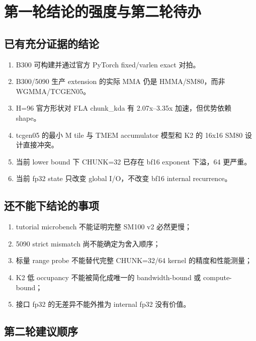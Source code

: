 \documentclass[11pt,a4paper,fontset=none]{ctexart}
\begin{document}
\section{第一轮结论的强度与第二轮待办}

\subsection{已有充分证据的结论}

\begin{enumerate}
  \item B300 可构建并通过官方 PyTorch fixed/varlen exact 对拍。
  \item B300/5090 生产 extension 的实际 MMA 仍是 HMMA/SM80，而非 WGMMA/TCGEN05。
  \item H=96 官方形状对 FLA chunk\_kda 有 2.07x--3.35x 加速，但优势依赖 shape。
  \item tcgen05 的最小 M tile 与 TMEM accumulator 模型和 K2 的 16x16 SM80
        设计直接冲突。
  \item 当前 lower bound 下 CHUNK=32 已存在 bf16 exponent 下溢，64 更严重。
  \item 当前 fp32 state 只改变 global I/O，不改变 bf16 internal recurrence。
\end{enumerate}

\subsection{还不能下结论的事项}

\begin{enumerate}
  \item tutorial microbench 不能证明完整 SM100 v2 必然更慢；
  \item 5090 strict mismatch 尚不能确定为舍入顺序；
  \item 标量 range probe 不能替代完整 CHUNK=32/64 kernel 的精度和性能测量；
  \item K2 低 occupancy 不能被简化成唯一的 bandwidth-bound 或 compute-bound；
  \item 接口 fp32 的无差异不能外推为 internal fp32 没有价值。
\end{enumerate}

\subsection{第二轮建议顺序}
\end{document}
